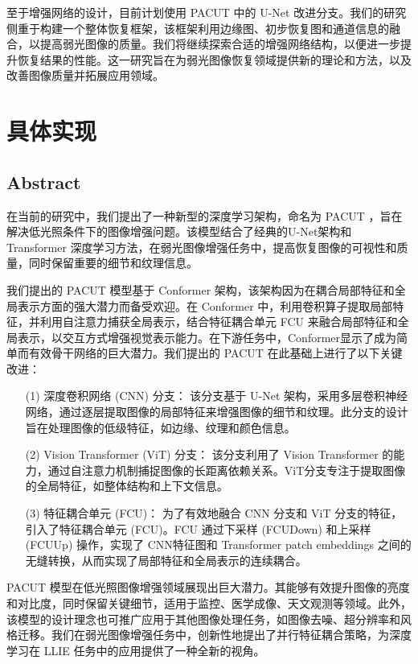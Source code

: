 \documentclass[a4paper, 10pt]{article}
\begin{document}
		至于增强网络的设计，目前计划使用 PACUT 中的 U-Net 改进分支。我们的研究侧重于构建一个整体恢复框架，该框架利用边缘图、初步恢复图和通道信息的融合，以提高弱光图像的质量。我们将继续探索合适的增强网络结构，以便进一步提升恢复结果的性能。这一研究旨在为弱光图像恢复领域提供新的理论和方法，以及改善图像质量并拓展应用领域。
		
		\section{具体实现}
		
		\subsection{Abstract}
		
		在当前的研究中，我们提出了一种新型的深度学习架构，命名为 PACUT ，旨在解决低光照条件下的图像增强问题。该模型结合了经典的U-Net架构和 Transformer 深度学习方法，在弱光图像增强任务中，提高恢复图像的可视性和质量，同时保留重要的细节和纹理信息。
		
		我们提出的 PACUT 模型基于 Conformer 架构，该架构因为在耦合局部特征和全局表示方面的强大潜力而备受欢迎。在 Conformer 中，利用卷积算子提取局部特征，并利用自注意力捕获全局表示，结合特征耦合单元 FCU 来融合局部特征和全局表示，以交互方式增强视觉表示能力。在下游任务中，Conformer显示了成为简单而有效骨干网络的巨大潜力。我们提出的 PACUT 在此基础上进行了以下关键改进：
		
		\begin{itemize}
			
		\item[(1)] 
			深度卷积网络 (CNN) 分支： 该分支基于 U-Net 架构，采用多层卷积神经网络，通过逐层提取图像的局部特征来增强图像的细节和纹理。此分支的设计旨在处理图像的低级特征，如边缘、纹理和颜色信息。
			
		\item[(2)]
			Vision Transformer (ViT) 分支： 该分支利用了 Vision Transformer 的能力，通过自注意力机制捕捉图像的长距离依赖关系。ViT分支专注于提取图像的全局特征，如整体结构和上下文信息。
			
		\item[(3)]
			特征耦合单元 (FCU)： 为了有效地融合 CNN 分支和 ViT 分支的特征，引入了特征耦合单元 (FCU)。FCU 通过下采样 (FCUDown) 和上采样 (FCUUp) 操作，实现了 CNN特征图和 Transformer patch embeddings 之间的无缝转换，从而实现了局部特征和全局表示的连续耦合。
			
		\end{itemize}
		
		
		PACUT 模型在低光照图像增强领域展现出巨大潜力。其能够有效提升图像的亮度和对比度，同时保留关键细节，适用于监控、医学成像、天文观测等领域。此外，该模型的设计理念也可推广应用于其他图像处理任务，如图像去噪、超分辨率和风格迁移。我们在弱光图像增强任务中，创新性地提出了并行特征耦合策略，为深度学习在 LLIE 任务中的应用提供了一种全新的视角。
		
\end{document}
